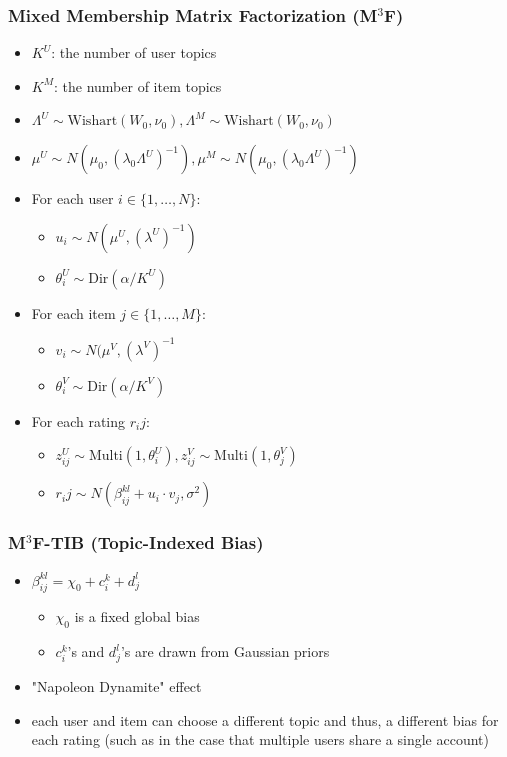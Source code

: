 \documentclass{beamer}
\begin{document}
\begin{frame}
	\frametitle{Mixed Membership Matrix Factorization (M$^3$F)}
	
	\begin{itemize}
		\item $K^U$: the number of user topics
		\item $K^M$: the number of item topics		
		\item $\Lambda^U \sim \text{Wishart}(W_0, \nu_0), \Lambda^M \sim \text{Wishart}(W_0, \nu_0)$
		\item $\mu^U \sim N(\mu_0, (\lambda_0 \Lambda^U)^{-1}), \mu^M \sim N(\mu_0, (\lambda_0 \Lambda^U)^{-1})$

		\item For each user $i \in \{1, \ldots, N\}$: \\
		\begin{itemize}		
			\item $u_i \sim N(\mu^U, (\lambda^U)^{-1})$
			\item $\theta_i^U \sim \text{Dir}(\alpha/K^U)$
		\end{itemize}	

		\item For each item $j \in \{1, \ldots, M\}$:
		\begin{itemize}
			\item $v_i \sim N(\mu^V, (\lambda^V)^{-1}$
			\item $\theta_i^V \sim \text{Dir}(\alpha/K^V)$	
		\end{itemize}	
		
		\item For each rating $r_ij$:
		\begin{itemize}
			\item $z_{ij}^U \sim \text{Multi}(1, \theta_i^U), z_{ij}^V \sim \text{Multi}(1, \theta_j^V)$
			\item $r_ij \sim N(\beta_{ij}^{kl} + u_i \cdot v_j, \sigma^2)$
		\end{itemize}			
	\end{itemize}
\end{frame}

\begin{frame}
	\frametitle{M$^3$F-TIB (Topic-Indexed Bias)}
	\begin{itemize}
		\item $\beta_{ij}^{kl} = \chi_0 + c_i^k + d_j^l$
		
		\begin{itemize}
			\item $\chi_0$ is a fixed global bias
			\item $c_i^k$'s and $d_j^l$'s are drawn from Gaussian priors
		\end{itemize}		
		
		\item "Napoleon Dynamite" effect	
	
		\item each user and item can choose a different topic and thus, a different bias for each rating (such as in the case that multiple users share a single account)
	
	\end{itemize}

\end{frame}
\end{document}
